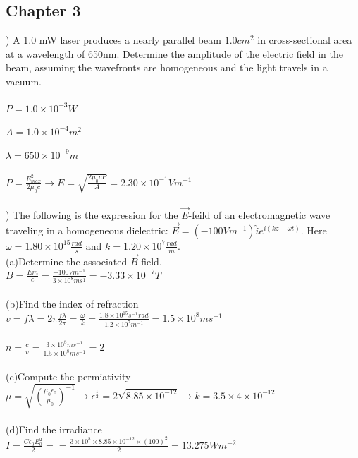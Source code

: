 \documentclass[12pt]{article}
\begin{document}
\subsection*{Chapter 3}
) A 1.0 mW laser produces a nearly parallel beam $1.0cm^{2}$ 
in cross-sectional area at a wavelength of 650nm. Determine the amplitude 
of the electric field in the beam, assuming the wavefronts are homogeneous and 
the light travels in a vacuum. \\\\
\noindent $P = 1.0\times 10^{-3}W$\\\\
\noindent $A = 1.0\times 10^{-4}m^{2}$\\\\
\noindent $\lambda = 650\times 10^{-9}m$\\\\
\noindent $P = \frac{E_{max}^{2}}{2\mu_{0}c}\rightarrow
E = \sqrt{\frac{2\mu_{0}cP}{A}} = 2.30\times10^{-1}Vm^{-1}$\\\\

) The following is the expression for the $\vec{E}$-feild of an 
electromagnetic wave traveling in a homogeneous dielectric: 
$\vec{E} = (-100Vm^{-1})\hat{i}e^{i(kz-\omega t)}$. Here 
$\omega = 1.80 \times 10^{15}\frac{rad}{s}$ and $k = 1.20 \times 10^{7}\frac{rad}{m}$.\\
\noindent (a)Determine the associated $\vec{B}$-field.\\
\noindent $B= \frac{Em}{c} = \frac{-100Vm^{-1}}{3\times10^{8}ms^{1}} = -3.33\times10^{-7}T$\\\\
\noindent (b)Find the index of refraction\\
\noindent $v = f\lambda = 2\pi\frac{f\lambda}{2\pi} = \frac{\omega}{k} = \frac{1.8\times10^{15}s^{-1}rad}{1.2\times10^{7}m^{-1}} 
= 1.5\times10^{8}ms^{-1}$\\\\
\noindent $n = \frac{c}{v} = \frac{3\times10^{8}ms^{-1}}{1.5\times10^{8}ms^{-1}} = 2$\\\\
\noindent (c)Compute the permiativity\\
\noindent $\mu = \sqrt{(\frac{\mu_{0}\epsilon_{0}}{\mu_{0}})^{-1}} 
\rightarrow \epsilon^{\frac{1}{2}}=2\sqrt{8.85\times10^{-12}}
\rightarrow k = 3.5\times4\times10^{-12}$\\\\
\noindent (d)Find the irradiance\\
\noindent $I = \frac{C\epsilon_{0}E_{0}^{2}}{2} = =\frac{3\times10^{8}\times8.85\times10^{-12}\times(100)^{2}}{2} = 13.275Wm^{-2}$\\\\
\end{document}
